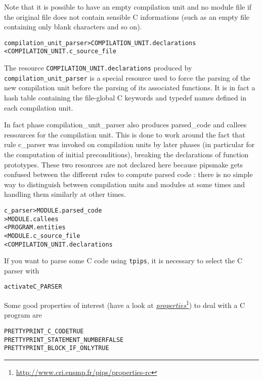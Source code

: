\documentclass[a4paper]{report}
\newenvironment{PipsMake}{\begin{alltt}}{\end{alltt}}
\newcommand{\LINK}[2]{\href{#2}{#1}\footnote{\url{#2}}\xspace}
\newcommand{\PROPERTIES}{\LINK{\emph{properties}}{http://www.cri.ensmp.fr/pips/properties-rc}}
\begin{document}
Note that it is possible to have an empty compilation unit and no module
file if the original file does not contain sensible C informations (such
as an empty file containing only blank characters and so on).

\begin{PipsMake}
compilation_unit_parser         > COMPILATION_UNIT.declarations
        < COMPILATION_UNIT.c_source_file
\end{PipsMake}

The resource \verb/COMPILATION_UNIT.declarations/ produced by
\verb/compilation_unit_parser/ is a special resource used to force the
parsing of the new compilation unit before the parsing of its associated
functions. It is in fact a hash table containing the file-global C
keywords and typedef names defined in each compilation unit.

In fact phase compilation\_unit\_parser also produces parsed\_code and callees ressources for the compilation unit. This is done to work around the fact that rule c\_parser was invoked on compilation units by later phases (in particular for the computation of initial preconditions), breaking the declarations of function prototypes. These two resources are not declared here because pipsmake gets confused between the different rules to compute parsed code : there is no simple way to distinguish between compilation units and modules at some times and handling them similarly at other times.


\begin{PipsMake}
c_parser                        > MODULE.parsed_code
                                > MODULE.callees
        < PROGRAM.entities
        < MODULE.c_source_file
        < COMPILATION_UNIT.declarations
\end{PipsMake}

If you want to parse some C code using \texttt{tpips}, it is necessary to
select the C parser with
\begin{alltt}
activate C_PARSER
\end{alltt}
Some good properties of interest (have a look at \PROPERTIES) to deal with
a C program are
\begin{alltt}
PRETTYPRINT_C_CODE TRUE
PRETTYPRINT_STATEMENT_NUMBER FALSE
PRETTYPRINT_BLOCK_IF_ONLY TRUE
\end{alltt}
\end{document}
